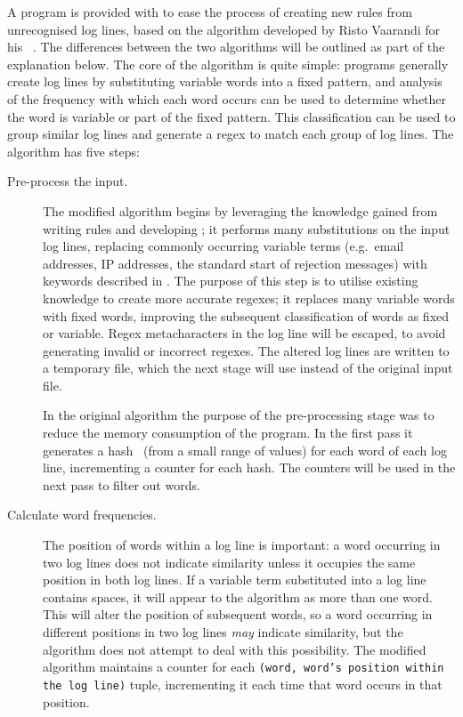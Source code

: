 A program is provided with \parsername{} to ease the process of creating
new rules from unrecognised log lines, based on the algorithm developed by
Risto Vaarandi for his ~\cite{slct-paper}.  The differences
between the two algorithms will be outlined as part of the explanation
below.  The core of the  algorithm is quite simple: programs
generally create log lines by substituting variable words into a fixed
pattern, and analysis of the frequency with which each word occurs can be
used to determine whether the word is variable or part of the fixed
pattern.  This classification can be used to group similar log lines and
generate a regex to match each group of log lines.  The algorithm has five
steps:

\begin{description}

    \item [Pre-process the input.]  The modified algorithm begins by
        leveraging the knowledge gained from writing rules and developing
        \parsername{}; it performs many substitutions on the input log
        lines, replacing commonly occurring variable terms (e.g.\ email
        addresses, IP addresses, the standard start of rejection messages)
        with keywords described in .  The
        purpose of this step is to utilise existing knowledge to create
        more accurate regexes; it replaces many variable words with fixed
        words, improving the subsequent classification of words as fixed or
        variable.  Regex metacharacters in the log line will be escaped, to
        avoid generating invalid or incorrect regexes.  The altered log
        lines are written to a temporary file, which the next stage will
        use instead of the original input file.

        In the original algorithm the purpose of the pre-processing stage
        was to reduce the memory consumption of the program.  In the first
        pass it generates a hash~\cite{hash-functions} (from a
        small range of values) for each word of each log line, incrementing
        a counter for each hash.  The counters will be used in the next
        pass to filter out words.

    \item [Calculate word frequencies.]  The position of words within a log
        line is important: a word occurring in two log lines does not
        indicate similarity unless it occupies the same position in both
        log lines.  If a variable term substituted into a log line contains
        spaces, it will appear to the algorithm as more than one word.
        This will alter the position of subsequent words, so a word
        occurring in different positions in two log lines \textit{may\/}
        indicate similarity, but the algorithm does not attempt to deal
        with this possibility.  The modified algorithm maintains a counter
        for each \texttt{(word, word's position within the log line)}
        tuple, incrementing it each time that word occurs in that position.


\end{description}
